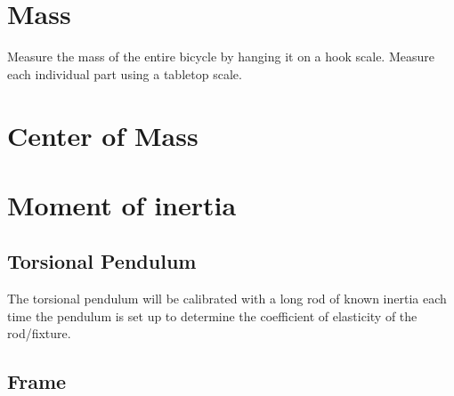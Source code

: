 \documentclass{article}
\begin{document}
\section{Mass}
Measure the mass of the entire bicycle by hanging it on a hook scale. Measure each individual part using a tabletop scale.

\section{Center of Mass}


\section{Moment of inertia}
\subsection{Torsional Pendulum}
The torsional pendulum will be calibrated with a long rod of known inertia each time the pendulum is set up to determine the coefficient of elasticity of the rod/fixture.
\subsection{Frame}
\end{document}
